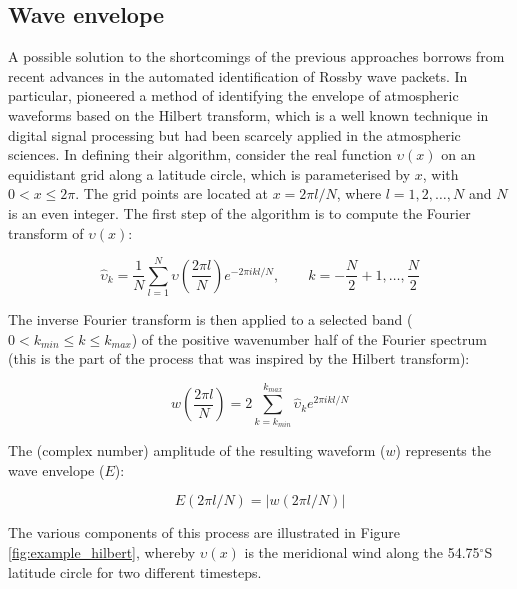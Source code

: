 \subsection{Wave envelope}

A possible solution to the shortcomings of the previous approaches borrows from recent advances in the automated identification of Rossby wave packets. In particular, \citet{Zimin2003} pioneered a method of identifying the envelope of atmospheric waveforms based on the Hilbert transform, which is a well known technique in digital signal processing but had been scarcely applied in the atmospheric sciences. In defining their algorithm, \citet{Zimin2003} consider the real function $\upsilon(x)$ on an equidistant grid along a latitude circle, which is parameterised by $x$, with $0 < x \leq 2\pi$. The grid points are located at $x = 2 \pi l / N$, where $l = 1, 2, \dotsc, N$ and $N$ is an even integer. The first step of the algorithm is to compute the Fourier transform of $\upsilon(x)$:

\begin{equation}\label{eq:fourier_transform}
\hat{\upsilon}_k = \frac{1}{N}\sum_{l=1}^N \upsilon \left( \frac{2 \pi l}{N} \right) e^{-2 \pi ikl/N},\qquad k = -\frac{N}{2} + 1, \dotsc, \frac{N}{2}
\end{equation}

The inverse Fourier transform is then applied to a selected band ($0 < k_{min} \leq k \leq k_{max}$) of the positive wavenumber half of the Fourier spectrum (this is the part of the process that was inspired by the Hilbert transform):

\begin{equation}\label{eq:inverse_transform}
w \left( \frac{2 \pi l}{N} \right) = 2 \sum_{k=k_{min}}^{k_{max}} \hat{\upsilon}_k e^{2\pi ikl/N}
\end{equation}

The (complex number) amplitude of the resulting waveform ($w$) represents the wave envelope ($E$):

\begin{equation}\label{eq:wave_envelope}
E(2 \pi l / N) = | w(2 \pi l / N) |
\end{equation}

The various components of this process are illustrated in Figure \ref{fig:example_hilbert}, whereby $\upsilon(x)$ is the meridional wind along the 54.75$^{\circ}$S latitude circle for two different timesteps. 

